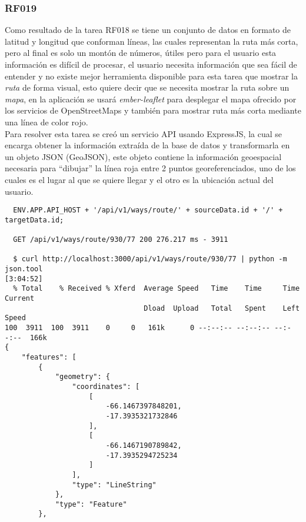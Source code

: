 \subsubsection{RF019}
\label{subs:RF019}
Como resultado de la tarea RF018 se tiene un conjunto de datos en formato de latitud y longitud que conforman líneas, las cuales representan la ruta más corta, pero al final es solo un montón de números, útiles pero para el usuario esta información es difícil de procesar, el usuario necesita información que sea fácil de entender y no existe mejor herramienta disponible para esta tarea que mostrar la \emph{ruta} de forma visual, esto quiere decir que se necesita mostrar la ruta sobre un \emph{mapa}, en la aplicación se usará \emph{ember-leaflet} para desplegar el mapa ofrecido por los servicios de OpenStreetMaps y también para mostrar ruta más corta mediante una línea de color rojo.\\

Para resolver esta tarea se creó un servicio API usando ExpressJS, la cual se encarga obtener la información extraída de la base de datos y transformarla en un objeto JSON (GeoJSON), este objeto contiene la información geoespacial necesaria para ``dibujar'' la línea roja entre 2 puntos georeferenciados, uno de los cuales es el lugar al que se quiere llegar y el otro es la ubicación actual del usuario. \\

\begin{verbatim}
  ENV.APP.API_HOST + '/api/v1/ways/route/' + sourceData.id + '/' + targetData.id;

  GET /api/v1/ways/route/930/77 200 276.217 ms - 3911

  $ curl http://localhost:3000/api/v1/ways/route/930/77 | python -m json.tool                                                       [3:04:52]
  % Total    % Received % Xferd  Average Speed   Time    Time     Time  Current
                                 Dload  Upload   Total   Spent    Left  Speed
100  3911  100  3911    0     0   161k      0 --:--:-- --:--:-- --:--:--  166k
{
    "features": [
        {
            "geometry": {
                "coordinates": [
                    [
                        -66.1467397848201,
                        -17.3935321732846
                    ],
                    [
                        -66.1467190789842,
                        -17.3935294725234
                    ]
                ],
                "type": "LineString"
            },
            "type": "Feature"
        },

\end{verbatim}

